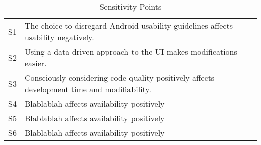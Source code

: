 \begin{table}[H]
	\begin{center}
		\begin{tabular}{| c | p{10cm} | }
    		\hline
			S1 & The choice to disregard Android usability guidelines affects
			     usability negatively.\\
			S2 & Using a data-driven approach to the UI makes modifications
			     easier.\\
			S3 & Consciously considering code quality positively affects
			     development time and modifiability.\\
			S4 & Blablablah affects availability positively  		\\															
			S5 & Blablablah affects availability positively 			\\
			S6 & Blablablah affects availability positively 			\\																													
			\hline
    	\end{tabular}
	\end{center}
	\label{tab:sensetivityPoints}
	\caption{Sensitivity Points}
\end{table}
